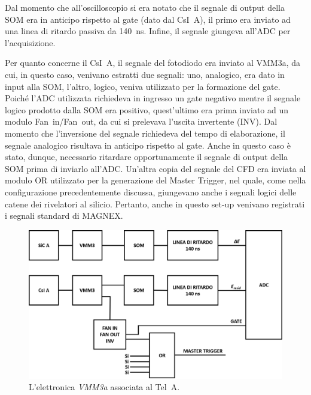 Dal momento che all'oscilloscopio si era notato che il segnale di output della SOM era in anticipo rispetto al gate (dato dal CsI~A), il primo era inviato ad una linea di ritardo passiva da 140~ns. Infine, il segnale giungeva all'ADC per l'acquisizione.


Per quanto concerne il CsI~A, il segnale del fotodiodo era inviato al VMM3a, da cui, in questo caso, venivano estratti due segnali: uno, analogico, era dato in input alla SOM, l'altro, logico, veniva utilizzato per la formazione del gate. 
Poiché l'ADC utilizzata richiedeva in ingresso un gate negativo mentre il segnale logico prodotto dalla SOM era positivo, quest'ultimo era prima inviato ad un modulo Fan~in/Fan~out, da cui si prelevava l'uscita invertente (INV).
Dal momento che l'inversione del segnale richiedeva del tempo di elaborazione, il segnale analogico risultava in anticipo rispetto al gate. Anche in questo caso è stato, dunque, necessario ritardare opportunamente il segnale di output della SOM prima di inviarlo all'ADC.
Un'altra copia del segnale del CFD era inviata al modulo OR utilizzato per la generazione del Master Trigger, nel quale, come nella configurazione precedentemente discussa, giungevano anche i segnali logici delle catene dei rivelatori al silicio.
Pertanto, anche in questo set-up venivano registrati i segnali standard di MAGNEX.

\begin{figure} [!p]
	\centering
	\includegraphics[width=\textwidth, keepaspectratio]{Grafici/elettronica_vmm.png}
	\caption{L'elettronica \emph{VMM3a} associata al Tel~A.} \label{fig:elettronica_vmm}
\end{figure}

